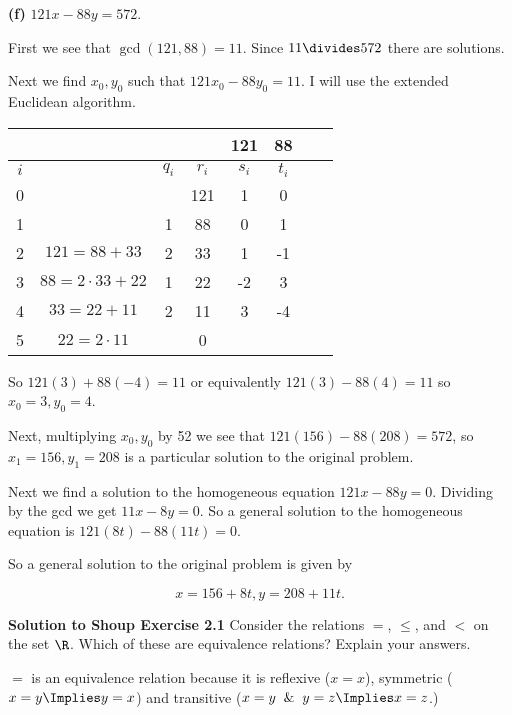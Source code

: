\documentclass[oneside,12pt]{amsart}
\begin{document}
\textbf{(f)} $121x - 88y = 572$.

First we see that $\gcd(121,88) = 11$. Since $11\divides 572$ there are solutions.

Next we find $x_0,y_0$ such that $121x_0 - 88y_0 = 11$. I will use the extended Euclidean algorithm.

\begin{tabular}{|c|c|c|c|c|c|c|c|}
\hline
\quad & \quad               & \quad   & \quad & 121     & 88   \\ \hline
$i$   & \quad               & $q_{i}$ & $r_i$ & $s_i$  & $t_i$ \\ \hline\hline
0     & \quad               & \quad   & 121   &  1     & 0     \\ \hline
1     & \quad               & 1       &  88   &  0     & 1     \\ \hline
2     & $121=88+33$         & 2       &  33   &  1     &-1     \\ \hline
3     & $ 88=2\cdot33+22$   & 1       &  22   & -2     & 3     \\ \hline
4     & $ 33=22+11$         & 2       &  11   &  3     &-4     \\ \hline
5     & $ 22=2\cdot 11$     &         &   0   &        &       \\ \hline
\end{tabular}

So $121(3) + 88 (-4) = 11$ or equivalently $121(3) - 88 (4) = 11$
so $x_0=3, y_0=4$.

Next, multiplying $x_0,y_0$ by 52 we see that
$121(156) - 88(208) = 572$, so $x_1=156, y_1=208$ is a particular solution
to the original problem.

Next we find a solution to the homogeneous equation $121x-88y=0$. Dividing by
the gcd we get $11x-8y=0$. So a general solution to the homogeneous equation is
$121(8t) - 88(11t)=0.$

So a general solution to the original problem is given by

$$x=156+8t, y=208+11t.$$

\bigskip

\textbf{Solution to Shoup Exercise 2.1} Consider the relations $=$, $\leq$, and $<$ on the set $\R$.
Which of these are equivalence relations? Explain your answers.

\bigskip

$=$ is an equivalence relation because it is reflexive ($x=x$), symmetric ($x=y\Implies y=x$)
and transitive ($x=y\And y=z \Implies x=z$.)
\end{document}
